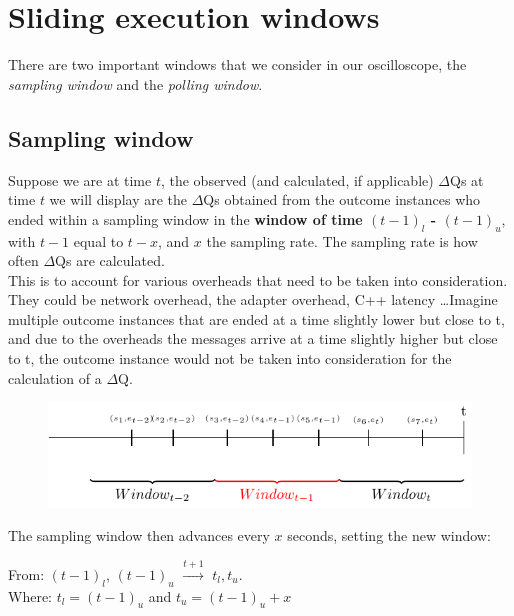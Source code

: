 \section{Sliding execution windows}

    There are two important windows that we consider in our oscilloscope, the \textit{sampling window} and the \textit{polling window}.

    \subsection{Sampling window}
    Suppose we are at time $t$, the observed (and calculated, if applicable) $\Delta$Qs at time $t$ we will display are the $\Delta$Qs obtained from the outcome instances who ended within a sampling window in the \textbf{window of time $(t-1)_{l}$ - $(t-1)_u$}, with $t-1$ equal to $t - x$, and $x$ the sampling rate. The sampling rate is how often $\Delta$Qs are calculated. \\
    This is to account for various overheads that need to be taken into consideration. They could be network overhead, the adapter overhead, C++ latency \dots Imagine multiple outcome instances that are ended at a time slightly lower but close to t, and due to the overheads the messages arrive at a time slightly higher but close to t, the outcome instance would not be taken into consideration for the calculation of a $\Delta$Q.
    
    \begin{figure}[H]
        \begin{center}
            \includegraphics{tikz/window.pdf}
        \end{center}
    \end{figure}
    
    The sampling window then advances every $x$ seconds, setting the new window: 
    \begin{center}
        From: $(t-1)_l$, $(t-1)_u$ $\xrightarrow{t + 1}$ $t_l, t_u$. \\
        Where: $t_l = (t-1)_u$ and $t_u = (t-1)_u + x$ 
    \end{center}

